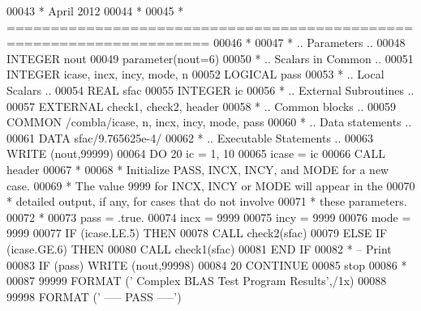 \begin{DoxyCode}
00043 \textcolor{comment}{*     April 2012}
00044 \textcolor{comment}{*}
00045 \textcolor{comment}{*  =====================================================================}
00046 \textcolor{comment}{*}
00047 \textcolor{comment}{*     .. Parameters ..}
00048       \textcolor{keywordtype}{INTEGER}          nout
00049       parameter(nout=6)
00050 \textcolor{comment}{*     .. Scalars in Common ..}
00051       \textcolor{keywordtype}{INTEGER}          icase, incx, incy, mode, n
00052       \textcolor{keywordtype}{LOGICAL}          pass
00053 \textcolor{comment}{*     .. Local Scalars ..}
00054       \textcolor{keywordtype}{REAL}             sfac
00055       \textcolor{keywordtype}{INTEGER}          ic
00056 \textcolor{comment}{*     .. External Subroutines ..}
00057       \textcolor{keywordtype}{EXTERNAL}         check1, check2, header
00058 \textcolor{comment}{*     .. Common blocks ..}
00059       \textcolor{keyword}{COMMON}           /combla/icase, n, incx, incy, mode, pass
00060 \textcolor{comment}{*     .. Data statements ..}
00061       \textcolor{keyword}{DATA}             sfac/9.765625e-4/
00062 \textcolor{comment}{*     .. Executable Statements ..}
00063       \textcolor{keyword}{WRITE} (nout,99999)
00064       \textcolor{keywordflow}{DO} 20 ic = 1, 10
00065          icase = ic
00066          \textcolor{keyword}{CALL }header
00067 \textcolor{comment}{*}
00068 \textcolor{comment}{*        Initialize PASS, INCX, INCY, and MODE for a new case.}
00069 \textcolor{comment}{*        The value 9999 for INCX, INCY or MODE will appear in the}
00070 \textcolor{comment}{*        detailed  output, if any, for cases that do not involve}
00071 \textcolor{comment}{*        these parameters.}
00072 \textcolor{comment}{*}
00073          pass = .true.
00074          incx = 9999
00075          incy = 9999
00076          mode = 9999
00077          \textcolor{keywordflow}{IF} (icase.LE.5) \textcolor{keywordflow}{THEN}
00078             \textcolor{keyword}{CALL }check2(sfac)
00079          \textcolor{keywordflow}{ELSE} \textcolor{keywordflow}{IF} (icase.GE.6) \textcolor{keywordflow}{THEN}
00080             \textcolor{keyword}{CALL }check1(sfac)
00081 \textcolor{keywordflow}{         END IF}
00082 \textcolor{comment}{*        -- Print}
00083          \textcolor{keywordflow}{IF} (pass) \textcolor{keyword}{WRITE} (nout,99998)
00084    20 \textcolor{keywordflow}{CONTINUE}
00085       stop
00086 \textcolor{comment}{*}
00087 99999 \textcolor{keyword}{FORMAT} (\textcolor{stringliteral}{' Complex BLAS Test Program Results'},/1x)
00088 99998 \textcolor{keyword}{FORMAT} (\textcolor{stringliteral}{'                                    ----- PASS -----'})

\end{DoxyCode}
